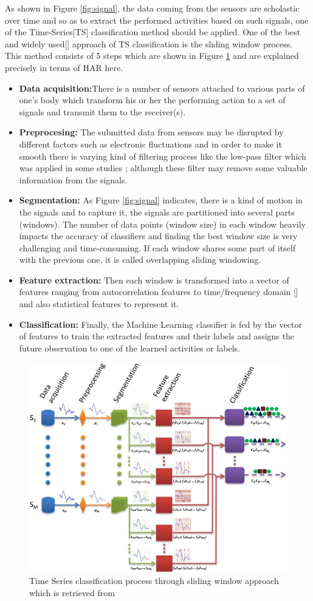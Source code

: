 As shown in Figure \ref{fig:signal}, the data coming from the sensors are scholastic over time and so as to extract the performed activities based on such signals, one of the Time-Series[TS] classification method should be applied. One of the best and widely used[] approach of TS classification is the sliding window process. This method consists of 5 steps which are shown in Figure \ref{fig:tsprocess} and are explained precisely in terms of HAR here.
\begin{itemize}
\item \textbf{Data acquisition:}There is a number of sensors attached to various parts of one's body which transform his or her the performing action to a set of signals and transmit them to the receiver(s). 
\item \textbf{Preprocesing:} The submitted data from sensors may be disrupted by different factors such as electronic fluctuations and in order to make it smooth there is varying kind of filtering process like the low-pass filter which was applied in some studies \cite{morris2014recofit}; although these filter may remove some valuable information from the signals.  
\item \textbf{Segmentation:}
As Figure \ref{fig:signal} indicates, there is a kind of motion in the signals and to capture it, the signals are partitioned into several parts (windows). The number of data points (window size) in each window heavily impacts the accuracy of classifiers and finding the best window size is very challenging and time-consuming. If each window shares some part of itself with the previous one, it is called overlapping sliding windowing.  

\item \textbf{Feature extraction:}
Then each window is transformed into a vector of features ranging from autocorrelation features \cite{morris2014recofit} to time/frequency domain [] and also statistical features to represent it.  
\item \textbf{Classification:}
Finally, the Machine Learning classifier is fed by the vector of features to train the extracted features and their labels and assigns the future observation to one of the learned activities or labels. 


\end{itemize}

\begin{figure}[h]
    \centering
    \includegraphics[width=.4\textwidth]{Figures/TSCprocess.jpeg}
    \caption{Time Series classification process through sliding window approach which is retrieved from \cite{banos2014window}}
    \label{fig:tsprocess}
\end{figure}



